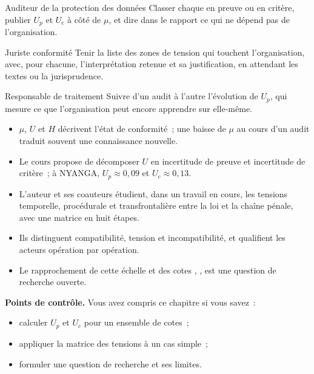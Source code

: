 \begin{boxmetier}{Auditeur de la protection des données}
Classer chaque \NEK{} en preuve ou en critère, publier $U_p$ et $U_c$ à
côté de $\mu$, et dire dans le rapport ce qui ne dépend pas de
l'organisation.
\end{boxmetier}

\begin{boxmetier}{Juriste conformité}
Tenir la liste des zones de tension qui touchent l'organisation, avec,
pour chacune, l'interprétation retenue et sa justification, en attendant
les textes ou la jurisprudence.
\end{boxmetier}

\begin{boxmetier}{Responsable de traitement}
Suivre d'un audit à l'autre l'évolution de $U_p$, qui mesure ce que
l'organisation peut encore apprendre sur elle-même.
\end{boxmetier}

\begin{boxresume}
\begin{itemize}
    \item $\mu$, $U$ et $H$ décrivent l'état de conformité~; une baisse de
          $\mu$ au cours d'un audit traduit souvent une connaissance
          nouvelle.
    \item Le cours propose de décomposer $U$ en incertitude de preuve et
          incertitude de critère~; à NYANGA, $U_p \approx 0{,}09$ et
          $U_c \approx 0{,}13$.
    \item L'auteur et ses coauteurs étudient, dans un travail en cours, les
          tensions temporelle, procédurale et transfrontalière entre la loi
          et la chaîne pénale, avec une matrice en huit étapes.
    \item Ils distinguent compatibilité, tension et incompatibilité, et
          qualifient les acteurs opération par opération.
    \item Le rapprochement de cette échelle et des cotes \OUI{}, \NON{},
          \NEK{} est une question de recherche ouverte.
\end{itemize}
\end{boxresume}

\begin{boxinfo}
\textbf{Points de contrôle.} Vous avez compris ce chapitre si vous savez~:
\begin{itemize}
    \item calculer $U_p$ et $U_c$ pour un ensemble de cotes~;
    \item appliquer la matrice des tensions à un cas simple~;
    \item formuler une question de recherche et ses limites.
\end{itemize}
\end{boxinfo}

